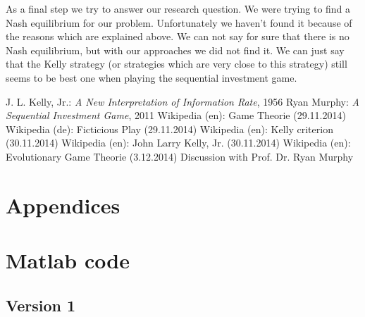 \documentclass[11pt]{article}
\begin{document}
As a final step we try to answer our research question. We were trying to find a Nash equilibrium for our problem. Unfortunately we haven't found it because of the reasons which are explained above. We can not say for sure that there is no Nash equilibrium, but with our approaches we did not find it. We can just say that the Kelly strategy (or strategies which are very close to this strategy) still seems to be best one when playing the sequential investment game.

\begin{thebibliography}{9}
	\bibitem{} J. L. Kelly, Jr.: \textit{A New Interpretation of Information Rate}, 1956	
	\bibitem{} Ryan Murphy: \textit{A Sequential Investment Game}, 2011
	\bibitem{} Wikipedia (en): Game Theorie (29.11.2014)
	\bibitem{} Wikipedia (de): Ficticious Play (29.11.2014)
	\bibitem{} Wikipedia (en): Kelly criterion (30.11.2014)
	\bibitem{} Wikipedia (en): John Larry Kelly, Jr. (30.11.2014)
	\bibitem{} Wikipedia (en): Evolutionary Game Theorie (3.12.2014)
	\bibitem{} Discussion with Prof. Dr. Ryan Murphy
\end{thebibliography}

\pagebreak
\appendix
{}
\section*{Appendices}
\section{Matlab code}
\subsection{Version 1}
\end{document}
